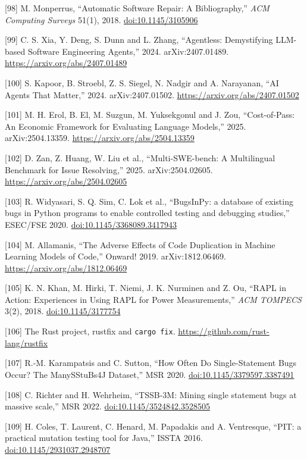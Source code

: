 \documentclass[10pt,letterpaper]{article}
\begin{document}
{[}98{]} M. Monperrus, ``Automatic Software Repair: A Bibliography,''
\emph{ACM Computing Surveys} 51(1), 2018.
\href{https://doi.org/10.1145/3105906}{doi:10.1145/3105906}

{[}99{]} C. S. Xia, Y. Deng, S. Dunn and L. Zhang, ``Agentless:
Demystifying LLM-based Software Engineering Agents,'' 2024.
arXiv:2407.01489. \url{https://arxiv.org/abs/2407.01489}

{[}100{]} S. Kapoor, B. Stroebl, Z. S. Siegel, N. Nadgir and A.
Narayanan, ``AI Agents That Matter,'' 2024. arXiv:2407.01502.
\url{https://arxiv.org/abs/2407.01502}

{[}101{]} M. H. Erol, B. El, M. Suzgun, M. Yuksekgonul and J. Zou,
``Cost-of-Pass: An Economic Framework for Evaluating Language Models,''
2025. arXiv:2504.13359. \url{https://arxiv.org/abs/2504.13359}

{[}102{]} D. Zan, Z. Huang, W. Liu et al., ``Multi-SWE-bench: A
Multilingual Benchmark for Issue Resolving,'' 2025. arXiv:2504.02605.
\url{https://arxiv.org/abs/2504.02605}

{[}103{]} R. Widyasari, S. Q. Sim, C. Lok et al., ``BugsInPy: a database
of existing bugs in Python programs to enable controlled testing and
debugging studies,'' ESEC/FSE 2020.
\href{https://doi.org/10.1145/3368089.3417943}{doi:10.1145/3368089.3417943}

{[}104{]} M. Allamanis, ``The Adverse Effects of Code Duplication in
Machine Learning Models of Code,'' Onward! 2019. arXiv:1812.06469.
\url{https://arxiv.org/abs/1812.06469}

{[}105{]} K. N. Khan, M. Hirki, T. Niemi, J. K. Nurminen and Z. Ou,
``RAPL in Action: Experiences in Using RAPL for Power Measurements,''
\emph{ACM TOMPECS} 3(2), 2018.
\href{https://doi.org/10.1145/3177754}{doi:10.1145/3177754}

{[}106{]} The Rust project, rustfix and \texttt{cargo\ fix}.
\url{https://github.com/rust-lang/rustfix}

{[}107{]} R.-M. Karampatsis and C. Sutton, ``How Often Do
Single-Statement Bugs Occur? The ManySStuBs4J Dataset,'' MSR 2020.
\href{https://doi.org/10.1145/3379597.3387491}{doi:10.1145/3379597.3387491}

{[}108{]} C. Richter and H. Wehrheim, ``TSSB-3M: Mining single statement
bugs at massive scale,'' MSR 2022.
\href{https://doi.org/10.1145/3524842.3528505}{doi:10.1145/3524842.3528505}

{[}109{]} H. Coles, T. Laurent, C. Henard, M. Papadakis and A.
Ventresque, ``PIT: a practical mutation testing tool for Java,'' ISSTA
2016.
\href{https://doi.org/10.1145/2931037.2948707}{doi:10.1145/2931037.2948707}
\end{document}
